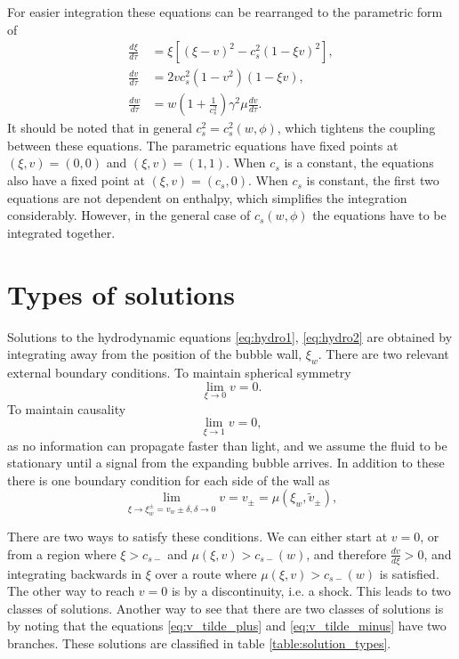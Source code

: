 For easier integration these equations can be rearranged to the parametric form of
\cite[eq. B.14-16]{hindmarsh_gw_pt_2019}
\begin{align}
\frac{d\xi}{d\tau} &= \xi \left[ (\xi - v)^2 - c_s^2 (1 - \xi v)^2 \right], \\
\frac{dv}{d\tau} &= 2 v c_s^2 (1 - v^2) (1 - \xi v), \\
\frac{dw}{d\tau} &= w \left( 1 + \frac{1}{c_s^2} \right) \gamma^2 \mu \frac{dv}{d\tau}.
\end{align}
It should be noted that in general $c_s^2 = c_s^2(w,\phi)$, which tightens the coupling between these equations.
The parametric equations have fixed points at
$(\xi,v) = (0,0)$ and
$(\xi,v) = (1,1)$.
When $c_s$ is a constant, the equations also have a fixed point at
$(\xi,v) = (c_s,0)$.
When $c_s$ is constant, the first two equations are not dependent on enthalpy, which simplifies the integration considerably.
However, in the general case of $c_s(w,\phi)$ the equations have to be integrated together.


\section{Types of solutions}
Solutions to the hydrodynamic equations \eqref{eq:hydro1}, \eqref{eq:hydro2} are obtained by integrating away from the position of the bubble wall, $\xi_w$.
There are two relevant external boundary conditions.
To maintain spherical symmetry
\begin{equation}
\lim_{\xi \rightarrow 0} v = 0.
\end{equation}
To maintain causality
\begin{equation}
\lim_{\xi \rightarrow 1} v = 0,
\end{equation}
as no information can propagate faster than light, and we assume the fluid to be stationary until a signal from the expanding bubble arrives.
In addition to these there is one boundary condition for each side of the wall as
\begin{equation}
\lim_{\xi \rightarrow \xi_w^\pm = v_w \pm \delta, \delta \rightarrow 0} v = v_\pm = \mu (\xi_w, \tilde{v}_\pm),
\end{equation}

There are two ways to satisfy these conditions.
We can either start at $v=0$, or from a region where $\xi > c_{s-}$ and $\mu(\xi,v) > c_{s-}(w)$, and therefore $\frac{dv}{d\xi} > 0$,
and integrating backwards in $\xi$ over a route where $\mu(\xi,v) > c_{s-}(w)$ is satisfied.
The other way to reach $v=0$ is by a discontinuity, i.e. a shock.
This leads to two classes of solutions.
Another way to see that there are two classes of solutions is by noting
that the equations \eqref{eq:v_tilde_plus} and \eqref{eq:v_tilde_minus} have two branches.
These solutions are classified in table \ref{table:solution_types}.

